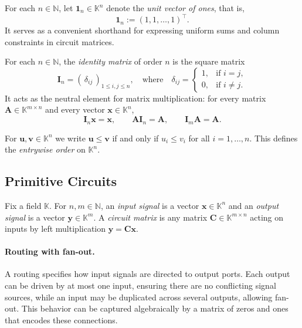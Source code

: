 \documentclass{article}
\newcommand{\K}{\mathbb{K}}                  %
\newcommand{\N}{\mathbb{N}}                  %
\newcommand{\vect}[1]{\mathbf{#1}}           %
\newcommand{\mat}[1]{\mathbf{#1}}            %
\newcommand{\id}{\mat{I}}                    %
\begin{document}
\begin{definition}
For each $n\in\N$, let $\mathbf{1}_{n}\in\K^{n}$ denote the \emph{unit vector of ones}, that is,
\[
\mathbf{1}_{n} := (1,1,\dots,1)^{\top}.
\]
It serves as a convenient shorthand for expressing uniform sums and column constraints in circuit matrices.
\end{definition}

\begin{definition}
For each \(n\in\N\), the \emph{identity matrix} of order \(n\) is the square matrix
\[
\id_n = (\,\delta_{ij}\,)_{1\le i,j\le n},
\quad\text{where}\quad
\delta_{ij} =
\begin{cases}
1, & \text{if } i=j,\\[2pt]
0, & \text{if } i\ne j.
\end{cases}
\]
It acts as the neutral element for matrix multiplication:
for every matrix \(\mat{A}\in\K^{m\times n}\) and every vector \(\vect{x}\in\K^{n}\),
\[
\id_n\vect{x} = \vect{x},
\qquad
\mat{A}\id_n = \mat{A},
\qquad
\id_m\mat{A} = \mat{A}.
\]
\end{definition}



\begin{definition}
For $\vect{u},\vect{v}\in\K^{n}$ we write $\vect{u}\le\vect{v}$ 
if and only if $u_i\le v_i$ for all $i=1,\dots,n$.
This defines the \emph{entrywise order} on $\K^{n}$.
\end{definition}

\subsection{Primitive Circuits}

\begin{definition}
Fix a field $\K$. For $n,m\in\N$, an \emph{input signal} is a vector $\vect{x}\in\K^{n}$ and an \emph{output signal} is a vector $\vect{y}\in\K^{m}$.
A \emph{circuit matrix} is any matrix $\mat{C}\in\K^{m\times n}$ acting on inputs by left multiplication $\vect{y}=\mat{C}\vect{x}$.
\end{definition}

\paragraph{Routing with fan-out.}
A routing specifies how input signals are directed to output ports.  
Each output can be driven by at most one input, ensuring there are no conflicting signal sources,  
while an input may be duplicated across several outputs, allowing fan-out.  
This behavior can be captured algebraically by a matrix of zeros and ones that encodes these connections.
\end{document}
